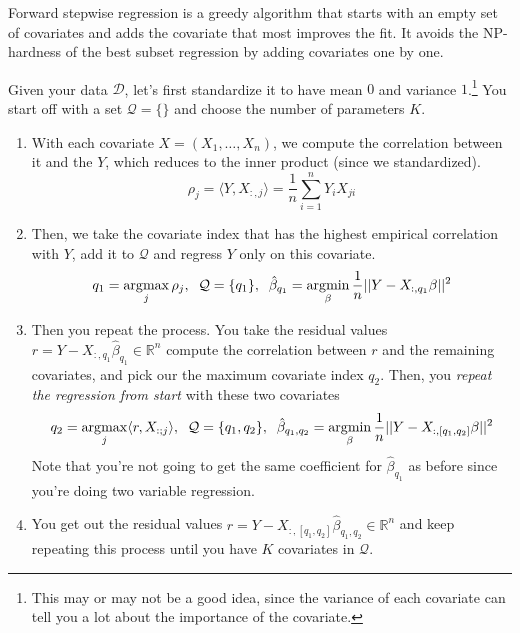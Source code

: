     Forward stepwise regression is a greedy algorithm that starts with an empty set of covariates and adds the covariate that most improves the fit. It avoids the NP-hardness of the best subset regression by adding covariates one by one. 

    \begin{definition}
      Given your data $\mathcal{D}$, let's first standardize it to have mean $0$ and variance $1$.\footnote{This may or may not be a good idea, since the variance of each covariate can tell you a lot about the importance of the covariate.} You start off with a set $\mathcal{Q} = \{\}$ and choose the number of parameters $K$. 
      \begin{enumerate}
        \item With each covariate $X = (X_1, \ldots, X_n)$, we compute the correlation between it and the $Y$, which reduces to the inner product (since we standardized). 
        \begin{equation}
          \rho_j = \langle Y, X_{:, j} \rangle = \frac{1}{n} \sum_{i=1}^n Y_i X_{ji}
        \end{equation}

        \item Then, we take the covariate index that has the highest empirical correlation with $Y$, add it to $\mathcal{Q}$ and regress $Y$ only on this covariate. 
        \begin{equation}
          q_1 = \argmax_j \rho_j , \;\; \mathcal{Q} = \{q_1\}, \;\; \hat{\beta}_{q_1} = \argmin_{\beta} \frac{1}{n} ||Y - X_{:, q_1} \beta||^2 
        \end{equation}

        \item Then you repeat the process. You take the residual values $r = Y - X_{:, q_1} \hat{\beta}_{q_1} \in \mathbb{R}^n$ compute the correlation between $r$ and the remaining covariates, and pick our the maximum covariate index $q_2$. Then, you \textit{repeat the regression from start} with these two covariates 
        \begin{equation}
          q_2 = \argmax_j \langle r, X_{: ; j} \rangle , \;\; \mathcal{Q} = \{q_1, q_2\}, \;\; \hat{\beta}_{q_1, q_2} = \argmin_{\beta} \frac{1}{n} ||Y - X_{:,[q_1, q_2]} \beta||^2
        \end{equation}
        Note that you're not going to get the same coefficient for $\hat{\beta}_{q_1}$ as before since you're doing two variable regression. 

        \item You get out the residual values $r = Y - X_{:, [q_1, q_2]} \hat{\beta}_{q_1, q_2} \in \mathbb{R}^n$ and keep repeating this process until you have $K$ covariates in $\mathcal{Q}$. 
      \end{enumerate}
    \end{definition}

